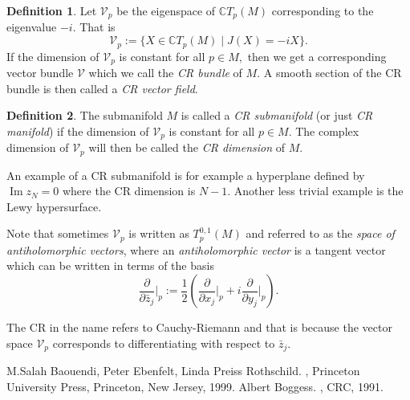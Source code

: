 \documentclass[12pt]{article}
\theoremstyle{theorem}
\theoremstyle{definition}
\newtheorem*{defn}{Definition}
\begin{document}
\begin{defn}
Let ${\mathcal{V}}_p$ be the eigenspace of ${\mathbb{C}} T_p(M)$ corresponding to the eigenvalue $-i.$  That is
\begin{equation*}
{\mathcal{V}}_p := \{ X \in {\mathbb{C}} T_p(M) \mid J(X) = -iX \} .
\end{equation*}
If the dimension of ${\mathcal{V}}_p$ is constant for all $p \in M,$ then 
we get a corresponding vector bundle ${\mathcal{V}}$ which we call the
{\em CR bundle} of $M.$  A smooth section of the CR bundle is then called
a {\em CR vector field}.
\end{defn}

\begin{defn}
The submanifold $M$ is called a {\em CR submanifold} (or just {\em CR manifold}) if the dimension of ${\mathcal{V}}_p$ is constant for all $p \in M.$
The complex dimension of ${\mathcal{V}}_p$ will then be called the
{\em CR dimension} of $M.$
\end{defn}

An example of a CR submanifold is for example a hyperplane defined by
$\operatorname{Im} z_N = 0$ where the CR dimension is $N-1.$  Another less trivial example is the Lewy hypersurface.

Note that sometimes ${\mathcal{V}}_p$ is written as $T_p^{0,1} (M)$ and referred to as the {\em space of antiholomorphic vectors}, where an {\em antiholomorphic vector} is a tangent vector which can be written in terms of the basis
\begin{equation*}
\frac{\partial}{\partial \bar{z}_j} \Bigg\rvert_p := 
\frac{1}{2}
\left(
\frac{\partial}{\partial x_j} \Bigg\rvert_p + i
\frac{\partial}{\partial y_j} \Bigg\rvert_p
\right) .
\end{equation*}

The CR in the name refers to Cauchy-Riemann and that is because the vector space
${\mathcal{V}}_p$ corresponds to differentiating with respect to $\bar{z}_j.$

\begin{thebibliography}{9}
M.\@ Salah Baouendi,
Peter Ebenfelt,
Linda Preiss Rothschild.
{\em {}},
Princeton University Press,
Princeton, New Jersey, 1999.
Albert Boggess.
{\em {}},
CRC, 1991.
\end{thebibliography}
\end{document}

